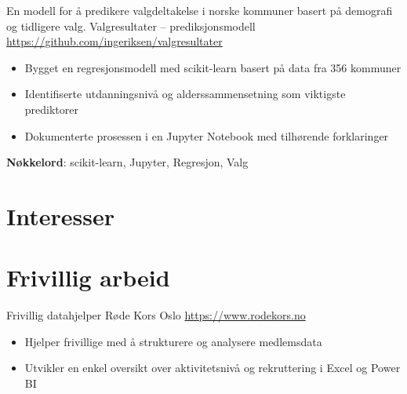\documentclass[a4paper, serif, 10pt]{moderncv}
\begin{document}
        {En modell for å predikere valgdeltakelse i norske kommuner basert på demografi og tidligere valg.}
        {Valgresultater – prediksjonsmodell}
        {\url{https://github.com/ingeriksen/valgresultater}}
        {}
        {\begin{itemize}
\item Bygget en regresjonsmodell med scikit-learn basert på data fra 356 kommuner
\item Identifiserte utdanningsnivå og alderssammensetning som viktigste prediktorer
\item Dokumenterte prosessen i en Jupyter Notebook med tilhørende forklaringer
\end{itemize}
\textbf{Nøkkelord}: scikit-learn, Jupyter, Regresjon, Valg}
\section{Interesser}

\section{Frivillig arbeid}

        {Frivillig datahjelper}
        {Røde Kors Oslo}
        {\url{https://www.rodekors.no}}
        {}
        {\begin{itemize}
\item Hjelper frivillige med å strukturere og analysere medlemsdata
\item Utvikler en enkel oversikt over aktivitetsnivå og rekruttering i Excel og Power BI
\end{itemize}}
\end{document}
